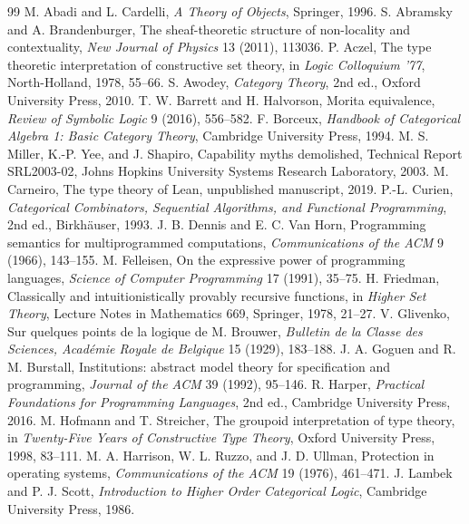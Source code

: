 \documentclass[11pt]{article}
\theoremstyle{definition}
\theoremstyle{remark}
\begin{document}
\begin{thebibliography}{99}
 M. Abadi and L. Cardelli, \emph{A Theory of Objects}, Springer, 1996.
 S. Abramsky and A. Brandenburger, The sheaf-theoretic structure of non-locality and contextuality, \emph{New Journal of Physics} 13 (2011), 113036.
 P. Aczel, The type theoretic interpretation of constructive set theory, in \emph{Logic Colloquium '77}, North-Holland, 1978, 55--66.
 S. Awodey, \emph{Category Theory}, 2nd ed., Oxford University Press, 2010.
 T. W. Barrett and H. Halvorson, Morita equivalence, \emph{Review of Symbolic Logic} 9 (2016), 556--582.
 F. Borceux, \emph{Handbook of Categorical Algebra 1: Basic Category Theory}, Cambridge University Press, 1994.
 M. S. Miller, K.-P. Yee, and J. Shapiro, Capability myths demolished, Technical Report SRL2003-02, Johns Hopkins University Systems Research Laboratory, 2003.
 M. Carneiro, The type theory of Lean, unpublished manuscript, 2019.
 P.-L. Curien, \emph{Categorical Combinators, Sequential Algorithms, and Functional Programming}, 2nd ed., Birkh\"auser, 1993.
 J. B. Dennis and E. C. Van Horn, Programming semantics for multiprogrammed computations, \emph{Communications of the ACM} 9 (1966), 143--155.
 M. Felleisen, On the expressive power of programming languages, \emph{Science of Computer Programming} 17 (1991), 35--75.
 H. Friedman, Classically and intuitionistically provably recursive functions, in \emph{Higher Set Theory}, Lecture Notes in Mathematics 669, Springer, 1978, 21--27.
 V. Glivenko, Sur quelques points de la logique de M. Brouwer, \emph{Bulletin de la Classe des Sciences, Acad\'emie Royale de Belgique} 15 (1929), 183--188.
 J. A. Goguen and R. M. Burstall, Institutions: abstract model theory for specification and programming, \emph{Journal of the ACM} 39 (1992), 95--146.
 R. Harper, \emph{Practical Foundations for Programming Languages}, 2nd ed., Cambridge University Press, 2016.
 M. Hofmann and T. Streicher, The groupoid interpretation of type theory, in \emph{Twenty-Five Years of Constructive Type Theory}, Oxford University Press, 1998, 83--111.
 M. A. Harrison, W. L. Ruzzo, and J. D. Ullman, Protection in operating systems, \emph{Communications of the ACM} 19 (1976), 461--471.
 J. Lambek and P. J. Scott, \emph{Introduction to Higher Order Categorical Logic}, Cambridge University Press, 1986.

\end{thebibliography}
\end{document}
